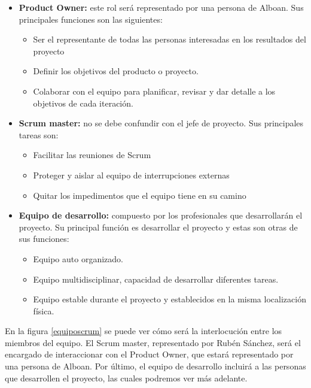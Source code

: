 \begin{itemize}
	\item \textbf{Product Owner:} este rol será representado por una persona de Alboan. Sus principales funciones son las siguientes:
	\begin{itemize}
		\item Ser el representante de todas las personas interesadas en los resultados del proyecto
		\item Definir los objetivos del producto o proyecto.
		\item Colaborar con el equipo para planificar, revisar y dar detalle a los objetivos de cada iteración.
	\end{itemize}
	\item \textbf{Scrum master:} no se debe confundir con el jefe de proyecto. Sus principales tareas son:
	\begin{itemize}
		\item Facilitar las reuniones de Scrum
		\item Proteger y aislar al equipo de interrupciones externas
		\item Quitar los impedimentos que el equipo tiene en su camino
	\end{itemize}
	\item \textbf{Equipo de desarrollo:} compuesto por los profesionales que desarrollarán el proyecto. Su principal función es desarrollar el proyecto y estas son otras de sus funciones:
	\begin{itemize}
		\item Equipo auto organizado.
		\item Equipo multidisciplinar, capacidad de desarrollar diferentes tareas.
		\item Equipo estable durante el proyecto y establecidos en la misma localización física.
	\end{itemize}
	
\end{itemize}

En la figura \ref{equiposcrum} se puede ver cómo será la interlocución entre los miembros del equipo. El Scrum master, representado por Rubén Sánchez, será el encargado de interaccionar con el Product Owner, que estará representado por una persona de Alboan. Por último, el equipo de desarrollo incluirá a las personas que desarrollen el proyecto, las cuales podremos ver más adelante.


